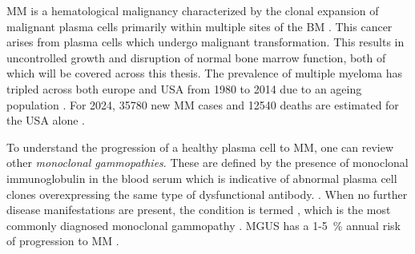 





%
\label{sec:intro_myeloma}%
\ac{MM} is a hematological malignancy characterized by the clonal expansion of
malignant plasma cells primarily within multiple sites of the \ac{BM}
\cite{yangPathogenesisTreatmentMultiple2022}. This cancer arises from plasma
cells  which undergo
malignant transformation. This results in uncontrolled growth and disruption of
normal bone marrow function, both of which will be covered across this thesis.
The prevalence of multiple myeloma has tripled across both europe and USA from
1980 to 2014 due to an ageing population
\cite{ociasTrendsHematologicalCancer2016, turessonRapidlyChangingMyeloma2018}.
For 2024, 35780 new \ac{MM} cases and 12540 deaths are estimated for the USA
alone \cite{siegelCancerStatistics20242024}.

To understand the progression of a healthy plasma cell to \ac{MM}, one can
review other \emph{monoclonal gammopathies}. These are defined by the presence
of monoclonal immunoglobulin in the blood serum which is indicative of abnormal
plasma cell clones overexpressing the same type of dysfunctional antibody.
\cite{kyleMonoclonalGammopathyUndetermined1997,
    fermandMonoclonalGammopathyClinical2018}. When no further disease manifestations
are present, the condition is termed , which is the most commonly
diagnosed monoclonal gammopathy \cite{kyleMonoclonalGammopathyUndetermined1997}.
\ac{MGUS} has a 1-\SI{5}{\percent} annual risk of progression to \ac{MM}
\cite{rajkumarInternationalMyelomaWorking2014}.

